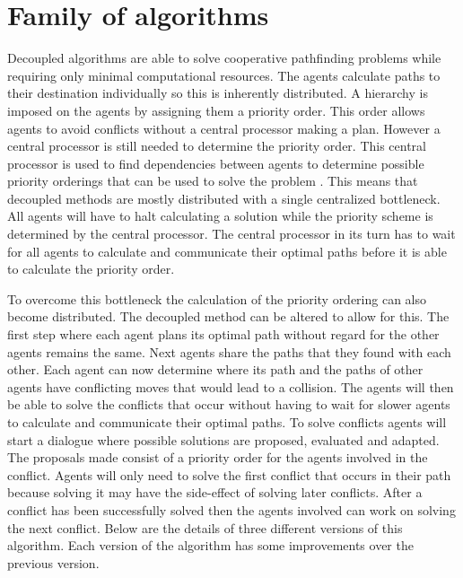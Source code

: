 \section{Family of algorithms}\label{sec:method}
Decoupled algorithms are able to solve cooperative pathfinding problems while
requiring only minimal computational resources. The agents calculate paths to
their destination individually so this is inherently distributed. A hierarchy
is imposed on the agents by assigning them a priority order. This order allows
agents to avoid conflicts without a central processor making a plan. However a
central processor is still needed to determine the priority order. This central
processor is used to
find dependencies between agents to determine possible priority orderings that
can be used to solve the problem \cite{latombe1991,bennewitz2002}. This means
that decoupled methods are mostly distributed with a single centralized
bottleneck. All agents will have to halt calculating a solution while the
priority scheme is determined by the central processor. The central processor
in its turn has to wait for all agents to calculate and communicate their
optimal paths before it is able to calculate the priority order.

To overcome this bottleneck the calculation of the priority ordering can also
become distributed. The decoupled method can be
altered to allow for this. The first step where each agent plans its optimal
path without regard for the other agents remains the same. Next agents share
the paths that they found with each other. Each agent can now determine where
its path and the paths of other agents have conflicting moves that would lead 
to a collision. The agents will then be able to solve the conflicts that occur 
without having to wait for slower agents to
calculate and communicate their optimal paths. To solve conflicts agents will
start a dialogue where possible solutions are proposed, evaluated and adapted.
The proposals made consist of a priority order for the agents involved in the
conflict. Agents will only need to solve the first conflict that occurs in
their path because solving it may have the side-effect of solving later
conflicts. After a conflict has been successfully solved then the agents
involved can work on solving the next conflict.
Below are the details of three different versions of this algorithm. Each
version of the algorithm has some improvements over the previous version.

